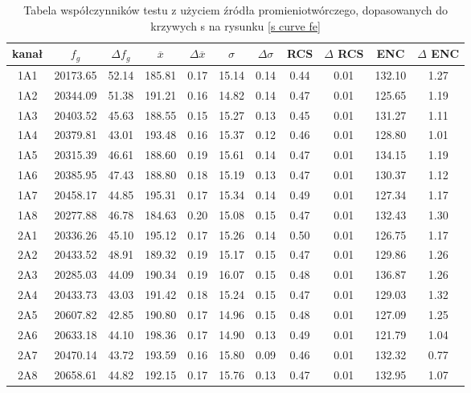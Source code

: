 \begin{table}
        \centering
        \caption{Tabela współczynników testu z użyciem źródła promieniotwórczego, dopasowanych do krzywych s na rysunku \ref{s curve fe}}
        \label{tabela wsp fe}
        \begin{tabular}{|c|c|c|c|c|c|c|c|c|c|c|}
        \hline
        kanał & $f_g$&$\Delta f_g$&$\overline{x}$&$\Delta \overline{x}$&  $\sigma$&  $\Delta \sigma$ &RCS&$\Delta$ RCS& ENC & $\Delta$ ENC \\ \hline
        1A1&20173.65&52.14&185.81&0.17&15.14&0.14&0.44&0.01&132.10&1.27  \\ \hline 
        1A2&20344.09&51.38&191.21&0.16&14.82&0.14&0.47&0.01&125.65&1.19  \\ \hline 
        1A3&20403.52&45.63&188.55&0.15&15.27&0.13&0.45&0.01&131.27&1.11  \\ \hline 
        1A4&20379.81&43.01&193.48&0.16&15.37&0.12&0.46&0.01&128.80&1.01  \\ \hline 
        1A5&20315.39&46.61&188.60&0.19&15.61&0.14&0.47&0.01&134.15&1.19  \\ \hline 
        1A6&20385.95&47.43&188.80&0.18&15.19&0.13&0.47&0.01&130.37&1.12  \\ \hline 
        1A7&20458.17&44.85&195.31&0.17&15.34&0.14&0.49&0.01&127.34&1.17  \\ \hline 
        1A8&20277.88&46.78&184.63&0.20&15.08&0.15&0.47&0.01&132.43&1.30  \\ \hline 
        2A1&20336.26&45.10&195.12&0.17&15.26&0.14&0.50&0.01&126.75&1.17  \\ \hline 
        2A2&20433.52&48.91&189.32&0.19&15.17&0.15&0.47&0.01&129.86&1.26  \\ \hline 
        2A3&20285.03&44.09&190.34&0.19&16.07&0.15&0.48&0.01&136.87&1.26  \\ \hline 
        2A4&20433.73&43.03&191.42&0.18&15.24&0.15&0.47&0.01&129.03&1.32  \\ \hline 
        2A5&20607.82&42.85&190.80&0.17&14.96&0.15&0.48&0.01&127.09&1.25  \\ \hline 
        2A6&20633.18&44.10&198.36&0.17&14.90&0.13&0.49&0.01&121.79&1.04  \\ \hline 
        2A7&20470.14&43.72&193.59&0.16&15.80&0.09&0.46&0.01&132.32&0.77  \\ \hline 
        2A8&20658.61&44.82&192.15&0.17&15.76&0.13&0.47&0.01&132.95&1.07  \\ \hline 

        \end{tabular}
\end{table}

